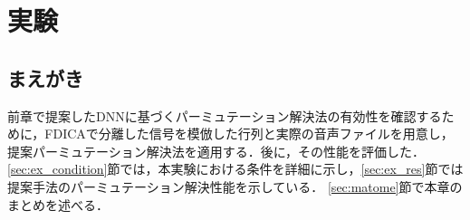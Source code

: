 \chapter{実験}
\label{chap:ex}

\section{まえがき}
前章で提案したDNNに基づくパーミュテーション解決法の有効性を確認するために，FDICAで分離した信号を模倣した行列と実際の音声ファイルを用意し，提案パーミュテーション解決法を適用する．後に，その性能を評価した．
\ref{sec:ex_condition}節では，本実験における条件を詳細に示し，\ref{sec:ex_res}節では提案手法のパーミュテーション解決性能を示している．
\ref{sec:matome}節で本章のまとめを述べる．
